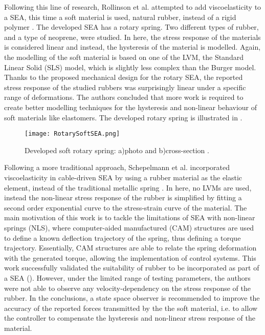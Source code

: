 Following this line of research, Rollinson et al. attempted to add viscoelasticity to a SEA, this time a soft material is used, natural rubber, instead of a rigid polymer \cite{rollinson2013design}. The developed SEA has a rotary spring. Two different types of rubber, and a type of neoprene, were studied. In here, the stress response of the materials is considered linear and instead, the hysteresis of the material is modelled. Again, the modelling of the soft material is based on one of the LVM, the Standard Linear Solid (SLS) model, which is slightly less complex than the Burger model. Thanks to the proposed mechanical design for the rotary SEA, the reported stress response of the studied rubbers was surprisingly linear under a specific range of deformations. The authors concluded that more work is required to create better modelling techniques for the hysteresis and non-linear behaviour of soft materials like elastomers. The developed rotary spring is illustrated in .

\begin{figure}[htb!]
	\centering
	\texttt{[image: RotarySoftSEA.png]}
	\caption{Developed soft rotary spring: a)photo and b)cross-section \cite{rollinson2013design}.}
	\label{fig:rotarySoftSEA}
\end{figure}

Following a more traditional approach, Schepelmann et al. incorporated viscoelasticity in cable-driven SEA by using a rubber material as the elastic element, instead of the traditional metallic spring \cite{schepelmann2014compact}. In here, no LVMs are used, instead the non-linear stress response of the rubber is simplified by fitting a second order exponential curve to the stress-strain curve of the material. The main motivation of this work is to tackle the limitations of SEA with non-linear springs (NLS), where computer-aided manufactured (CAM) structures are used to define a known deflection trajectory of the spring, thus defining a torque trajectory. Essentially, CAM structures are able to relate the spring deformation with the generated torque, allowing the implementation of control systems. This work successfully validated the suitability of rubber to be incorporated as part of a SEA (). However, under the limited range of testing parameters, the authors were not able to observe any velocity-dependency on the stress response of the rubber. In the conclusions, a state space observer is recommended to improve the accuracy of the reported forces transmitted by the the soft material, i.e. to allow the controller to compensate the hysteresis and non-linear stress response of the material.

